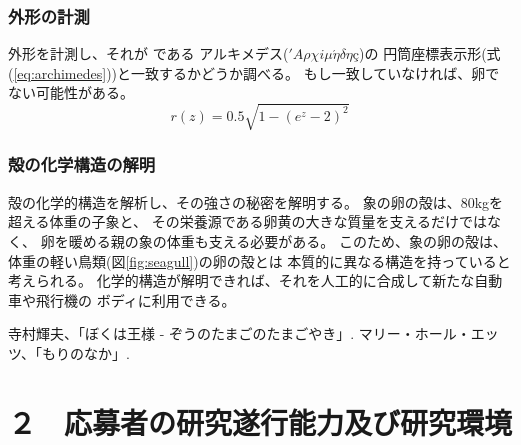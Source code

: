\documentclass[11pt,a4j,dvipdfmx]{jarticle} 					%
\newcommand{\研究課題名}{象の卵}
\newcommand{\研究機関名}{逢坂大学}
\newcommand{\研究代表者氏名}{湯川秀樹}
\newcommand{\研究期間の最終元号年度}{8}  %
\begin{document}
\subsubsection{外形の計測}
        外形を計測し、それが
        である
        アルキメデス(\('A\rho\chi i\mu\acute{\eta}\delta\eta\mbox{\c{c}}\))の
        円筒座標表示形(式(\ref{eq:archimedes}))と一致するかどうか調べる。
        もし一致していなければ、卵でない可能性がある。
        \begin{equation}
        	\label{eq:archimedes}
        	r(z) = 0.5\sqrt{1-(e^z-2)^2}
        \end{equation}

\subsubsection{殻の化学構造の解明}
	殻の化学的構造を解析し、その強さの秘密を解明する。
	象の卵の殻は、80kgを超える体重の子象と、
	その栄養源である卵黄の大きな質量を支えるだけではなく、
	卵を暖める親の象の体重も支える必要がある。
	このため、象の卵の殻は、体重の軽い鳥類(図\ref{fig:seagull})の卵の殻とは
	本質的に異なる構造を持っていると考えられる。
	化学的構造が解明できれば、それを人工的に合成して新たな自動車や飛行機の
	ボディに利用できる。

		

\vspace*{1zw}
\begin{thebibliography}{99}
	 寺村輝夫、「ぼくは王様 - ぞうのたまごのたまごやき」.
	 マリー・ホール・エッツ、「もりのなか」.
\end{thebibliography}




\section{２　応募者の研究遂行能力及び研究環境}

\PapersInstructions	%
\end{document}
